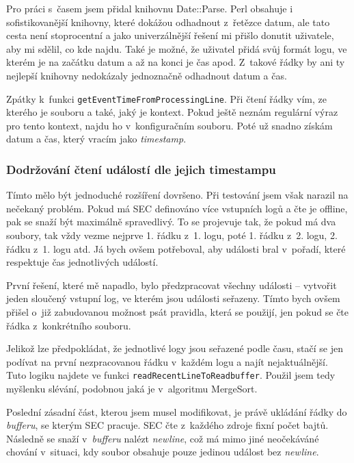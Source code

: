 \documentclass[thesis=B,czech]{FITthesis}[2012/06/26]
\begin{document}
Pro práci s~časem jsem přidal knihovnu Date::Parse. \cite{dateParse} Perl obsahuje i sofistikovanější knihovny, které dokážou odhadnout z~řetězce datum, ale tato cesta není stoprocentní a jako univerzálnější řešení mi přišlo donutit uživatele, aby mi sdělil, co kde najdu. Také je možné, že uživatel přidá svůj formát logu, ve kterém je na začátku datum a až na konci je  čas apod. Z~takové řádky by ani ty nejlepší knihovny nedokázaly jednoznačně odhadnout datum a čas.

Zpátky k~funkci \texttt{getEventTimeFromProcessingLine}. Při čtení řádky vím, ze kterého je souboru a také, jaký je kontext. Pokud ještě neznám regulární výraz pro tento kontext, najdu ho v~konfiguračním souboru. Poté už snadno získám datum a čas, který vracím jako \textit{timestamp}.

\subsubsection{Dodržování čtení událostí dle jejich timestampu}

Tímto mělo být jednoduché rozšíření dovršeno. Při testování jsem však narazil na nečekaný problém. Pokud má SEC definováno více vstupních logů a čte je offline, pak se snaží být maximálně spravedlivý. To se projevuje tak, že pokud má dva soubory, tak vždy vezme nejprve 1. řádku z~1. logu, poté 1. řádku z~2. logu, 2. řádku z~1. logu atd. Já bych ovšem potřeboval, aby události bral v~pořadí, které respektuje čas jednotlivých událostí.

První řešení, které mě napadlo, bylo předzpracovat všechny události -- vytvořit jeden sloučený vstupní log, ve kterém jsou události seřazeny. Tímto bych ovšem přišel o~již zabudovanou možnost psát pravidla, která se použijí, jen pokud se čte řádka z~konkrétního souboru. 

Jelikož lze předpokládat, že jednotlivé logy jsou seřazené podle času, stačí se jen podívat na první nezpracovanou řádku v~každém logu a najít nejaktuálnější. Tuto logiku najdete ve funkci \texttt{readRecentLineToReadbuffer}. Použil jsem tedy myšlenku slévání, podobnou jaká je v~algoritmu MergeSort.

Poslední zásadní část, kterou jsem musel modifikovat, je právě ukládání řádky do \textit{bufferu}, se kterým SEC pracuje. SEC čte z~každého zdroje fixní počet bajtů. Následně se snaží v~\textit{bufferu} nalézt \textit{newline}, což má mimo jiné neočekáváné chování v~situaci, kdy soubor obsahuje pouze jedinou událost bez \textit{newline}. 
\end{document}
